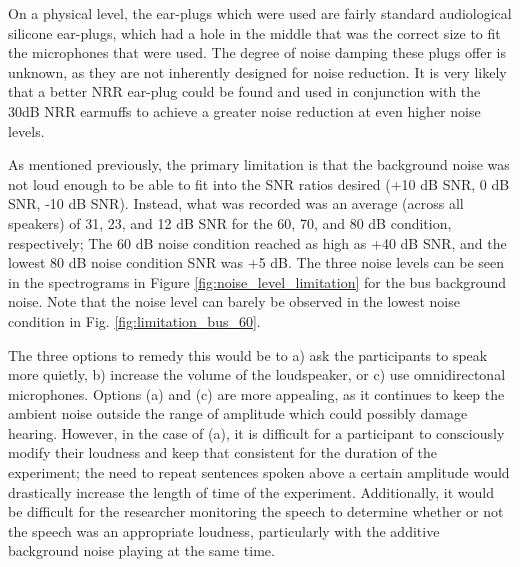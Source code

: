\DIFaddbegin {}

\DIFaddend On a physical level, the ear-plugs which were used are fairly standard audiological silicone ear-plugs, which had a hole in the middle that was the correct size to fit the microphones that were used.  The degree of noise damping these plugs offer is unknown, as they are not inherently designed for noise reduction.  It is very likely that a better NRR ear-plug could be found and used in conjunction with the 30dB NRR earmuffs to achieve a greater noise reduction at even higher noise levels.

As mentioned previously, the primary limitation is that the background noise was not loud enough to be able to fit into the SNR ratios desired (+10 dB SNR, 0 dB SNR, -10 dB SNR).  Instead, what was recorded was an average (across all speakers) of 31, 23, and 12 dB SNR for the 60, 70, and 80 dB condition, respectively; The 60 dB noise condition reached as high as +40 dB SNR, and the lowest 80 dB noise condition SNR was +5 dB. The three noise levels can be seen in the spectrograms in Figure \ref{fig:noise_level_limitation} for the bus background noise.  Note that the noise level can barely be observed in the lowest noise condition in Fig. \ref{fig:limitation_bus_60}.

The three options to remedy this would be to a) ask the participants to speak more quietly, b) increase the volume of the loudspeaker, or c) use omnidirectonal microphones.  Options (a) and (c) are more appealing, as it continues to keep the ambient noise outside the range of amplitude which could possibly damage hearing.  However, in the case of (a), it is difficult for a participant to consciously modify their loudness and keep that consistent for the duration of the experiment; the need to repeat sentences spoken above a certain amplitude would drastically increase the length of time of the experiment.  Additionally, it would be difficult for the researcher monitoring the speech to determine whether or not the speech was an appropriate loudness, particularly with the additive background noise playing at the same time.  

